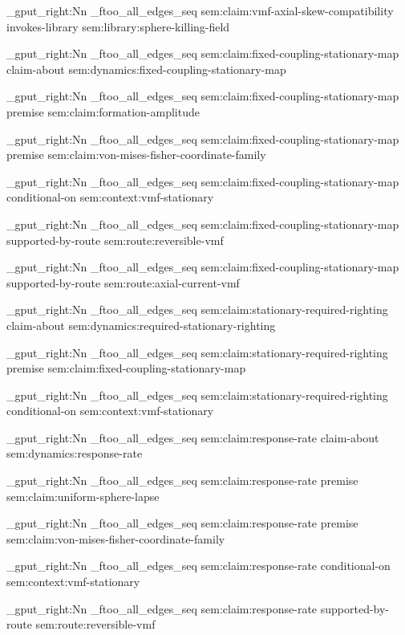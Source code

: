 \seq_gput_right:Nn \g_ftoo_all_edges_seq { { sem:claim:vmf-axial-skew-compatibility } { invokes-library } { sem:library:sphere-killing-field } }

\seq_gput_right:Nn \g_ftoo_all_edges_seq { { sem:claim:fixed-coupling-stationary-map } { claim-about } { sem:dynamics:fixed-coupling-stationary-map } }

\seq_gput_right:Nn \g_ftoo_all_edges_seq { { sem:claim:fixed-coupling-stationary-map } { premise } { sem:claim:formation-amplitude } }

\seq_gput_right:Nn \g_ftoo_all_edges_seq { { sem:claim:fixed-coupling-stationary-map } { premise } { sem:claim:von-mises-fisher-coordinate-family } }

\seq_gput_right:Nn \g_ftoo_all_edges_seq { { sem:claim:fixed-coupling-stationary-map } { conditional-on } { sem:context:vmf-stationary } }

\seq_gput_right:Nn \g_ftoo_all_edges_seq { { sem:claim:fixed-coupling-stationary-map } { supported-by-route } { sem:route:reversible-vmf } }

\seq_gput_right:Nn \g_ftoo_all_edges_seq { { sem:claim:fixed-coupling-stationary-map } { supported-by-route } { sem:route:axial-current-vmf } }

\seq_gput_right:Nn \g_ftoo_all_edges_seq { { sem:claim:stationary-required-righting } { claim-about } { sem:dynamics:required-stationary-righting } }

\seq_gput_right:Nn \g_ftoo_all_edges_seq { { sem:claim:stationary-required-righting } { premise } { sem:claim:fixed-coupling-stationary-map } }

\seq_gput_right:Nn \g_ftoo_all_edges_seq { { sem:claim:stationary-required-righting } { conditional-on } { sem:context:vmf-stationary } }

\seq_gput_right:Nn \g_ftoo_all_edges_seq { { sem:claim:response-rate } { claim-about } { sem:dynamics:response-rate } }

\seq_gput_right:Nn \g_ftoo_all_edges_seq { { sem:claim:response-rate } { premise } { sem:claim:uniform-sphere-lapse } }

\seq_gput_right:Nn \g_ftoo_all_edges_seq { { sem:claim:response-rate } { premise } { sem:claim:von-mises-fisher-coordinate-family } }

\seq_gput_right:Nn \g_ftoo_all_edges_seq { { sem:claim:response-rate } { conditional-on } { sem:context:vmf-stationary } }

\seq_gput_right:Nn \g_ftoo_all_edges_seq { { sem:claim:response-rate } { supported-by-route } { sem:route:reversible-vmf } }


